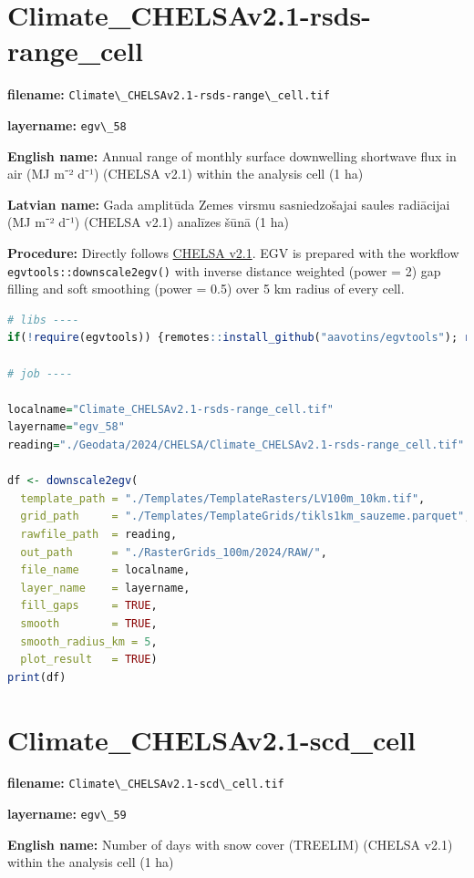 \documentclass[
]{book}
\newcommand{\passthrough}[1]{#1}
\begin{document}
\section{Climate\_CHELSAv2.1-rsds-range\_cell}\label{ch06.058}

\textbf{filename:} \passthrough{\lstinline!Climate\_CHELSAv2.1-rsds-range\_cell.tif!}

\textbf{layername:} \passthrough{\lstinline!egv\_58!}

\textbf{English name:} Annual range of monthly surface downwelling shortwave flux in air (MJ m⁻² d⁻¹) (CHELSA v2.1) within the analysis cell (1 ha)

\textbf{Latvian name:} Gada amplitūda Zemes virsmu sasniedzošajai saules radiācijai (MJ m⁻² d⁻¹) (CHELSA v2.1) analīzes šūnā (1 ha)

\textbf{Procedure:} Directly follows \hyperref[Ch04.11]{CHELSA v2.1}. EGV is prepared with the
workflow \passthrough{\lstinline!egvtools::downscale2egv()!} with inverse distance weighted (power = 2)
gap filling and soft smoothing (power = 0.5) over 5 km radius of every cell.

\begin{lstlisting}[language=R]
# libs ----
if(!require(egvtools)) {remotes::install_github("aavotins/egvtools"); require(egvtools)}

# job ----

localname="Climate_CHELSAv2.1-rsds-range_cell.tif"
layername="egv_58"
reading="./Geodata/2024/CHELSA/Climate_CHELSAv2.1-rsds-range_cell.tif"

df <- downscale2egv(
  template_path = "./Templates/TemplateRasters/LV100m_10km.tif",
  grid_path     = "./Templates/TemplateGrids/tikls1km_sauzeme.parquet",
  rawfile_path  = reading,
  out_path      = "./RasterGrids_100m/2024/RAW/",
  file_name     = localname,
  layer_name    = layername,
  fill_gaps     = TRUE,
  smooth        = TRUE,
  smooth_radius_km = 5,
  plot_result   = TRUE)
print(df)
\end{lstlisting}

\section{Climate\_CHELSAv2.1-scd\_cell}\label{ch06.059}

\textbf{filename:} \passthrough{\lstinline!Climate\_CHELSAv2.1-scd\_cell.tif!}

\textbf{layername:} \passthrough{\lstinline!egv\_59!}

\textbf{English name:} Number of days with snow cover (TREELIM) (CHELSA v2.1) within the analysis cell (1 ha)
\end{document}
